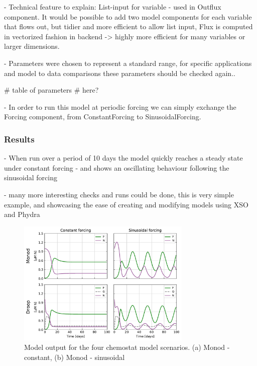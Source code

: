 \documentclass[journal abbreviation, manuscript]{copernicus}
\begin{document}
- Technical feature to explain: List-input for variable - used in Outflux component. It would be possible to add two model components for each variable that flows out, but tidier and more efficient to allow list input, Flux is computed in vectorized fashion in backend -> highly more efficient for many variables or larger dimensions.

- Parameters were chosen to represent a standard range, for specific applications and model to data comparisons these parameters should be checked again..

# table of parameters # here?

- In order to run this model at periodic forcing we can simply exchange the Forcing component, from ConstantForcing to SinusoidalForcing.


\subsubsection{Results}

- When run over a period of 10 days the model quickly reaches a steady state under constant forcing
- and shows an oscillating behaviour following the sinusoidal forcing 

- many more interesting checks and runs could be done, this is very simple example, and showcasing the ease of creating and modifying models using XSO and Phydra

\begin{figure}[t]
\includegraphics[width=8.3cm]{Figures/firstdraft_plots/01_chemostat_output.pdf}
\caption{Model output for the four chemostat model scenarios. (a) Monod - constant, (b) Monod - sinusoidal}
\label{Figure:ResultsChemostat}
\end{figure}


\end{document}
